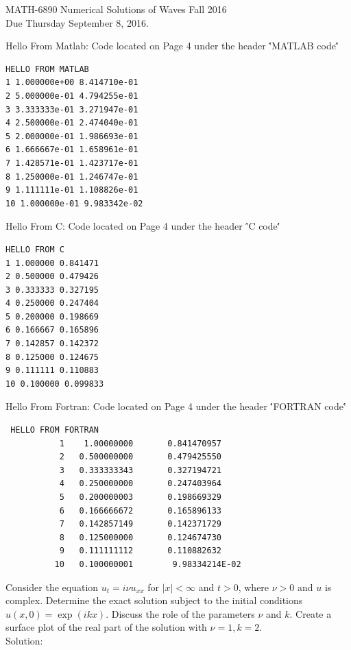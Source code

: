 
\pagestyle{empty}


\begin{center}
\large{ MATH-6890 \hspace{1in} Numerical Solutions of Waves  \hspace{1in}Fall 2016 \\ Due Thursday September 8, 2016.}\end{center}

\bigskip
{} \ec

\benum

\item Hello From Matlab: Code located on Page 4 under the header \''MATLAB code\''\\
\begin{lstlisting}
HELLO FROM MATLAB 
1 1.000000e+00 8.414710e-01 
2 5.000000e-01 4.794255e-01 
3 3.333333e-01 3.271947e-01 
4 2.500000e-01 2.474040e-01 
5 2.000000e-01 1.986693e-01 
6 1.666667e-01 1.658961e-01 
7 1.428571e-01 1.423717e-01 
8 1.250000e-01 1.246747e-01 
9 1.111111e-01 1.108826e-01 
10 1.000000e-01 9.983342e-02 
\end{lstlisting}

\item Hello From C: Code located on Page 4 under the header \''C code\''\\
\begin{lstlisting}
HELLO FROM C
1 1.000000 0.841471
2 0.500000 0.479426
3 0.333333 0.327195
4 0.250000 0.247404
5 0.200000 0.198669
6 0.166667 0.165896
7 0.142857 0.142372
8 0.125000 0.124675
9 0.111111 0.110883
10 0.100000 0.099833
\end{lstlisting}
\item Hello From Fortran: Code located on Page 4 under the header \''FORTRAN code\''\\
\begin{lstlisting}
 HELLO FROM FORTRAN
           1    1.00000000       0.841470957    
           2   0.500000000       0.479425550    
           3   0.333333343       0.327194721    
           4   0.250000000       0.247403964    
           5   0.200000003       0.198669329    
           6   0.166666672       0.165896133    
           7   0.142857149       0.142371729    
           8   0.125000000       0.124674730    
           9   0.111111112       0.110882632    
          10   0.100000001        9.98334214E-02
\end{lstlisting}
\item \benum
\item Consider the equation $u_t=i\nu u_{xx}$ for $|x|<\infty$ and $t>0$, where $\nu>0$ and $u$ is complex. Determine the exact solution subject to the initial conditions $u(x,0)=\exp(ikx)$. Discuss the  role of the parameters $\nu$ and $k$. Create a surface plot of the real part of the solution with $\nu=1,k=2.$\\
Solution:\\

